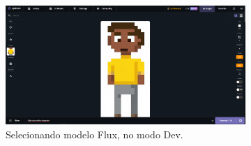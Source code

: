 \begin{figure}[htbp]
    \centering
    \caption{\small Processo da utilização 4 do CGDream (Imagem)}
    \label{fig:cgDream4}
    \begin{subfigure}{0.9\linewidth}
        \includegraphics[width=1\linewidth]{figs/cgDream/tela_img_FluxDev3.PNG}
        \caption{\small Selecionando modelo Flux, no modo Dev.}
        \label{fig:cgDream4a}
    \end{subfigure}
    \begin{subfigure}{0.15\linewidth}

\end{subfigure}
\end{figure}
